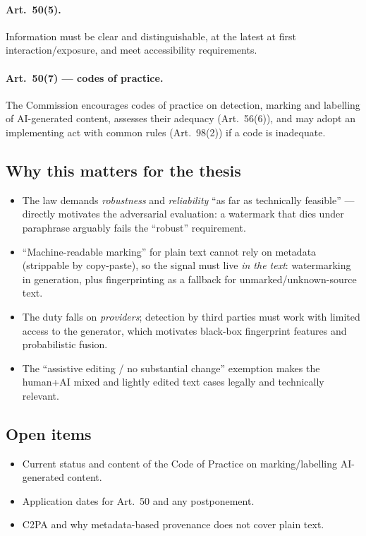 \documentclass[10pt,a4paper,twocolumn]{article}
\begin{document}
\paragraph{Art.~50(5).} Information must be clear and distinguishable, at the latest at first interaction/exposure, and meet accessibility requirements.

\paragraph{Art.~50(7) --- codes of practice.}
The Commission encourages codes of practice on detection, marking and labelling of AI-generated content, assesses their adequacy (Art.~56(6)), and may adopt an implementing act with common rules (Art.~98(2)) if a code is inadequate.

\subsection{Why this matters for the thesis}
\begin{itemize}
  \item The law demands \emph{robustness} and \emph{reliability} ``as far as technically feasible'' --- directly motivates the adversarial evaluation: a watermark that dies under paraphrase arguably fails the ``robust'' requirement.
  \item ``Machine-readable marking'' for plain text cannot rely on metadata (strippable by copy-paste), so the signal must live \emph{in the text}: watermarking in generation, plus fingerprinting as a fallback for unmarked/unknown-source text.
  \item The duty falls on \emph{providers}; detection by third parties must work with limited access to the generator, which motivates black-box fingerprint features and probabilistic fusion.
  \item The ``assistive editing / no substantial change'' exemption makes the human+AI mixed and lightly edited text cases legally and technically relevant.
\end{itemize}

\subsection{Open items}
\begin{itemize}
  \item Current status and content of the Code of Practice on marking/labelling AI-generated content.
  \item Application dates for Art.~50 and any postponement.
  \item C2PA and why metadata-based provenance does not cover plain text.
\end{itemize}
\end{document}
